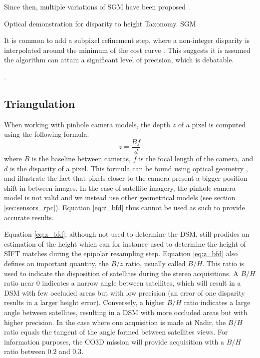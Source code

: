 Since then, multiple variations of SGM have been proposed \cite{facciolo_mgm_2015, poggi_learning_2016, dumas_improving_2022}.


Optical demonstration for disparity to height
Taxonomy. SGM

It is common to add a subpixel refinement step, where a non-integer disparity is interpolated around the minimum of the cost curve \cite{haller_real-time_2010}. This suggests it is assumed the algorithm can attain a significant level of precision, which is debatable. 

. 

\subsection{Triangulation}
When working with pinhole camera models, the depth $z$ of a pixel is computed using the following formula:
\begin{equation}
	z=\frac{Bf}{d}\label{eq:z_bfd}
\end{equation}
where $B$ is the baseline between cameras, $f$ is the focal length of the camera, and $d$ is the disparity of a pixel. This formula can be found using optical geometry \cite{bolles_epipolar-plane_1987}, and illustrate the fact that pixels closer to the camera present a bigger position shift in between images. In the case of satellite imagery, the pinhole camera model is not valid and we instead use other geometrical models (see section \ref{sec:sensors_rpc}). Equation \eqref{eq:z_bfd} thus cannot be used as such to provide accurate results.
\begin{remark}
	 Equation \eqref{eq:z_bfd}, although not used to determine the DSM, still prodides an estimation of the height which can for instance used to determine the height of SIFT matches during the epipolar resampling step. Equation \eqref{eq:z_bfd} also defines an important quantity, the $B/z$ ratio, usually called $B/H$. This ratio is used to indicate the disposition of satellites during the stereo acquisitions. A $B/H$ ratio near $0$ indicates a narrow angle between satellites, which will result in a DSM with few occluded areas but with low precision (an error of one disparity results in a larger height error). Conversely, a higher $B/H$ ratio indicates a large angle between satellites, resulting in a DSM with more occluded areas but with higher precision. In the case where one acquisition is made at Nadir, the $B/H$ ratio equals the tangent of the angle formed between satellites views. For information purposes, the CO3D mission will provide acquisition with a $B/H$ ratio between $0.2$ and $0.3$. 
\end{remark}

